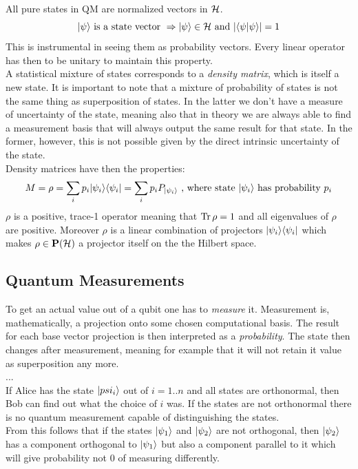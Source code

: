 	All pure states in QM are normalized vectors in $\mathcal{H}$.
	$$ |\psi \rangle \text{ is a state vector } \Rightarrow |\psi \rangle\in\mathcal{H} \text{ and }  \vert\langle\psi|\psi\rangle\vert = 1$$
	This is instrumental in seeing them as probability vectors. Every linear operator has then to be unitary to maintain this property.\\
	A statistical mixture of states corresponds to a \emph{density matrix}, which is itself a new state. It is important to note that a mixture of probability of states is not the same thing as superposition of states. In the latter we don't have a measure of uncertainty of the state, meaning also that in theory we are always able to find a measurement basis that will always output the same result for that state. In the former, however, this is not possible given by the direct intrinsic uncertainty of the state.\\
	Density matrices have then the properties:
	$$ M = \rho = \sum_i p_i |\psi_i \rangle\langle \psi_i| = \sum_i p_i P_{|\psi_i \rangle} \text{  , where state }|\psi_i \rangle\text{ has probability } p_i $$ 
	$\rho$ is a positive, trace-1 operator meaning that $\operatorname{Tr}{\rho} = 1$ and all eigenvalues of $\rho$ are positive. Moreover $\rho$ is a linear combination of projectors $|\psi_i\rangle\langle \psi_i|$ which makes $\rho\in\mathbf{P}(\mathcal{H})$ a projector itself on the the Hilbert space.
	
		\subsection{Quantum Measurements}
		To get an actual value out of a qubit one has to \textit{measure} it. Measurement is, mathematically, a projection onto some chosen computational basis. The result for each base vector projection is then interpreted as a \emph{probability}. The state then changes after measurement, meaning for example that it will not retain it value as superposition any more.\\
		...\\
		
		If Alice has the state $|psi_i \rangle$ out of $i=1..n$ and all states are orthonormal, then Bob can find out what the choice of $i$ was.
		If the states are not orthonormal there is no quantum measurement capable of distinguishing the states. \\
		From this follows that if the states $|\psi_1 \rangle$ and $|\psi_2 \rangle$ are not orthogonal, then $|\psi_2 \rangle$ has a component orthogonal to $|\psi_1 \rangle$ but also a component parallel to it which will give probability not $0$ of measuring differently.
		

